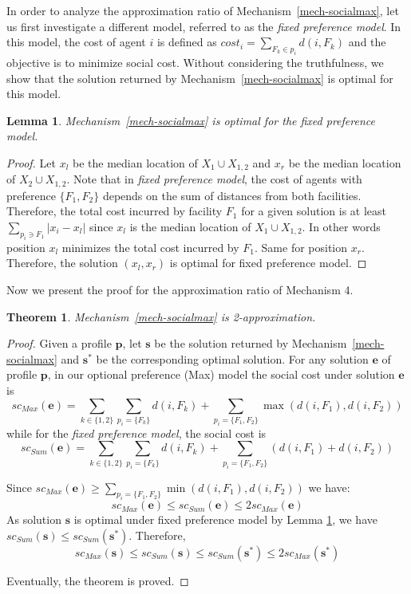 \documentclass[twoside,11pt]{article}
\newtheorem{theorem}{Theorem}
\newtheorem{lemma}{Lemma}
\newcommand{\bd}{\mathbf}
\begin{document}
In order to analyze the approximation ratio of Mechanism~\ref{mech-socialmax}, let us first investigate a different model, referred to as the \emph{fixed preference model}. In this model, the cost of agent $i$ is defined as $cost_{i} = \sum_{F_k \in p_{i}} d (i, F_{k})$ and the objective is to minimize social cost.
Without considering the truthfulness, we show that the solution returned by Mechanism~\ref{mech-socialmax} is optimal for this model.
\begin{lemma}\label{lemma7}
Mechanism~\ref{mech-socialmax} is optimal for the fixed preference model.
\end{lemma}
\begin{proof}
Let $x_l$ be the median location of $X_{1} \cup X_{1,2}$ and $x_r$ be the median location of $X_{2} \cup X_{1,2}$.
%
Note that in \emph{fixed preference model}, the cost of agents with preference $\{F_1, F_2\}$ depends on the sum of distances from both facilities. Therefore, the total cost incurred by facility $F_1$ for a given solution is at least $\sum_{p_i \ni F_1} |x_i-x_l|$ since $x_l$ is the median location of $X_{1} \cup X_{1,2}$. In other words position $x_l$ minimizes the total cost incurred by $F_1$. Same for position $x_r$.
Therefore, the solution $(x_l,x_r)$ is optimal for fixed preference model.
\end{proof}
Now we present the proof for the approximation ratio of Mechanism 4.

\begin{theorem}\label{t-max-social-upper}
Mechanism~\ref{mech-socialmax} is 2-approximation.
\end{theorem}
\begin{proof}
Given a profile $\bd{p}$, let $\bd{s}$ be the solution returned by Mechanism~\ref{mech-socialmax} and $\bd{s^*}$ be the corresponding optimal solution.
For any solution $\bd{e}$ of profile $\bd{p}$, in our optional preference (Max) model the social cost under solution $\bd{e}$ is
$$sc_{Max}(\bd{e}) = \sum_{k \in \{1,2\}} \sum_{p_{i} = \{F_k\}} d (i, F_{k})
+ \sum_{p_{i} = \{F_1,F_2\}} \max (d (i, F_{1}), d (i, F_{2}))$$
while for the \emph{fixed preference model}, the social cost is
$$sc_{Sum}(\bd{e}) = \sum_{k \in \{1,2\}} \sum_{p_{i} = \{F_k\}} d (i, F_{k})
+ \sum_{p_{i} = \{F_1,F_2\}} (d (i, F_{1}) + d (i, F_{2}))$$

\noindent Since
$
sc_{Max} (\bd{e})  \geq \sum_{p_{i} = \{F_{1}, F_{2}\}} \min (d (i, F_{1}), d (i, F_{2}))
$
we have:
$$
sc_{Max}(\bd{e}) \le sc_{Sum}(\bd{e}) \le 2 sc_{Max}(\bd{e})
$$
%
As solution $\bd{s}$ is optimal under fixed preference model by Lemma \ref{lemma7}, we have  $sc_{Sum} (\bd{s}) \leq sc_{Sum} (\bd{s^*})$.
Therefore,
$$ sc_{Max} (\bd{s}) \leq sc_{Sum} (\bd{s}) \leq sc_{Sum} (\bd{s^*}) \leq 2sc_{Max} (\bd{s^*}) $$

\noindent
Eventually, the theorem is proved.
%

\end{proof}
\end{document}
